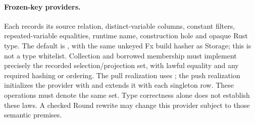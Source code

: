 \paragraph{Frozen-key providers.} Each  records its source relation,
distinct-variable columns, constant filters, repeated-variable equalities,
runtime name, construction hole and opaque Rust  type. The default is
, with the same unkeyed Fx build
hasher as Storage; this is not a type whitelist.
Collection and borrowed membership must implement precisely the recorded
selection/projection set, with lawful equality and any required hashing or ordering.
The pull realization uses ; the push realization initializes
the provider with  and extends it with each singleton row.
These operations must denote the same set.
Type correctness alone does not establish these laws. A checked Round rewrite
may change this provider subject to those semantic premises.
